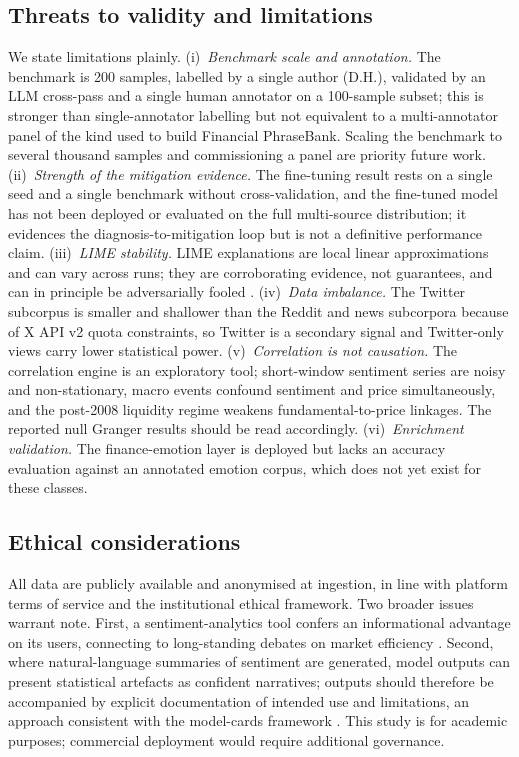 \documentclass{aims}
\numberwithin{equation}{section}
\begin{document}
\subsection{Threats to validity and limitations}
We state limitations plainly. (i)~\emph{Benchmark scale and annotation.} The
benchmark is 200 samples, labelled by a single author (D.H.), validated by an LLM cross-pass and
a single human annotator on a 100-sample subset; this is stronger than
single-annotator labelling but not equivalent to a multi-annotator panel of the kind
used to build Financial PhraseBank. Scaling the benchmark to several thousand samples
and commissioning a panel are priority future work. (ii)~\emph{Strength of the
mitigation evidence.} The fine-tuning result rests on a single seed and a single
benchmark without cross-validation, and the fine-tuned model has not been deployed or
evaluated on the full multi-source distribution; it evidences the
diagnosis-to-mitigation loop but is not a definitive performance claim.
(iii)~\emph{LIME stability.} LIME explanations are local linear approximations and
can vary across runs; they are corroborating evidence, not guarantees, and can in
principle be adversarially fooled \citep{slack2020}. (iv)~\emph{Data imbalance.} The
Twitter subcorpus is smaller and shallower than the Reddit and news subcorpora
because of X API v2 quota constraints, so Twitter is a secondary signal and
Twitter-only views carry lower statistical power. (v)~\emph{Correlation is not
causation.} The correlation engine is an exploratory tool; short-window sentiment
series are noisy and non-stationary, macro events confound sentiment and price
simultaneously, and the post-2008 liquidity regime weakens fundamental-to-price
linkages. The reported null Granger results should be read accordingly.
(vi)~\emph{Enrichment validation.} The finance-emotion layer is deployed but lacks an
accuracy evaluation against an annotated emotion corpus, which does not yet exist for
these classes.

\subsection{Ethical considerations}
All data are publicly available and anonymised at ingestion, in line with platform
terms of service and the institutional ethical framework. Two broader issues warrant
note. First, a sentiment-analytics tool confers an informational advantage on its
users, connecting to long-standing debates on market efficiency \citep{fama1970}.
Second, where natural-language summaries of sentiment are generated, model outputs
can present statistical artefacts as confident narratives; outputs should therefore
be accompanied by explicit documentation of intended use and limitations, an approach
consistent with the model-cards framework \citep{mitchell2019}. This study is for
academic purposes; commercial deployment would require additional governance.
\end{document}
